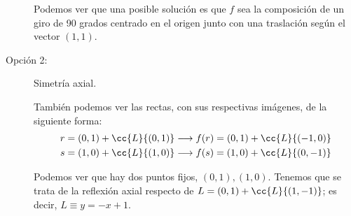 \begin{ejercicio}
\begin{description}
        Podemos ver que una posible solución es que $f$ sea la composición de un giro de 90 grados centrado en el origen junto con una traslación según el vector $(1,1)$.
        
        \item[Opción 2:] Simetría axial.

        También podemos ver las rectas, con sus respectivas imágenes, de la siguiente forma:
        \begin{gather*}
            r=(0,1)+\cc{L}\{(0,1)\} \longrightarrow f(r)=(0,1)+\cc{L}\{(-1,0)\} \\
            s=(1,0)+\cc{L}\{(1,0)\} \longrightarrow f(s)=(1,0)+\cc{L}\{(0,-1)\}
        \end{gather*}

        Podemos ver que hay dos puntos fijos, $(0,1), (1,0)$. Tenemos que se trata de la reflexión axial respecto de $L=(0,1)+\cc{L}\{(1,-1)\}$; es decir, $L\equiv y=-x+1$.
    \end{description}
\end{ejercicio}

